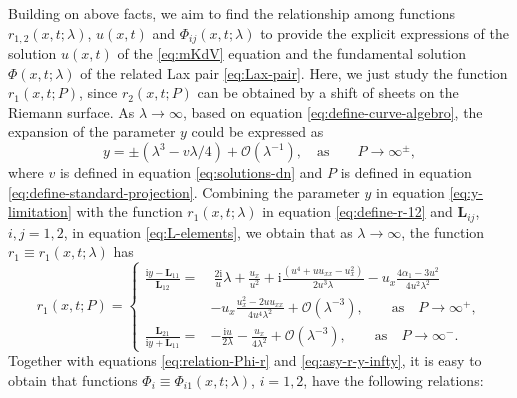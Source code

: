 \documentclass[11pt,reqno]{amsart}
\newcommand{\ii}{\mathrm{i}}
\numberwithin{equation}{section}
\begin{document}
Building on above facts, we aim to find the relationship among functions $r_{1,2}(x,t;\lambda)$, $u(x,t)$ and $\Phi_{ij}(x,t;\lambda)$ to provide the explicit expressions of the solution $u(x,t)$ of the \ref{eq:mKdV} equation and the fundamental solution $\Phi(x,t;\lambda)$ of the related Lax pair \eqref{eq:Lax-pair}.
Here, we just study the function $r_1(x,t;P)$, since $r_2(x,t;P)$ can be obtained by a shift of sheets on the Riemann surface.
As $\lambda\rightarrow \infty$, based on equation \eqref{eq:define-curve-algebro}, 
the expansion of the parameter $y$ could be expressed as 
\begin{equation}\label{eq:y-limitation}
	y=\pm \left(\lambda^3-v\lambda/4\right)+\mathcal{O}(\lambda^{-1}), \quad \text{as} \qquad P \rightarrow \infty^{\pm},
\end{equation}
where $v$ is defined in equation \eqref{eq:solutions-dn} and $P$ is defined in equation \eqref{eq:define-standard-projection}.
Combining the parameter $y$ in equation \eqref{eq:y-limitation} with the function $r_{1}(x,t;\lambda)$ in equation \eqref{eq:define-r-12} and $\mathbf{L}_{ij}$, $i,j=1,2$, in equation \eqref{eq:L-elements}, we obtain that as $\lambda\rightarrow \infty$, the function $r_{1}\equiv  r_{1}(x,t;\lambda)$ has 
\begin{equation}\label{eq:asy-r-y-infty}
		r_{1}(x,t;P)=\left\{
		\begin{aligned}
			\frac{ \ii y-\mathbf{L}_{11}}{\mathbf{L}_{12}}=&\ \frac{2\ii }{u}\lambda+\frac{ u_x}{u^2}+\ii\frac{(u^4+uu_{xx}-u_x^2)}{2u^3\lambda}-u_x\frac{4\alpha_1-3u^2}{4u^2\lambda^2}\\
			&-u_x\frac{u_x^2-2uu_{xx}}{4u^4\lambda^2}+\mathcal{O}(\lambda^{-3}),\qquad \text{as}\quad 
			P \rightarrow \infty^{+},\!\!\! \\
			\frac{\mathbf{L}_{21}}{ \ii y+\mathbf{L}_{11}}=& -\frac{\ii u}{2\lambda}-\frac{ u_x}{4\lambda^2}+\mathcal{O}(\lambda^{-3}), \qquad \text{as}\quad 
			P \rightarrow \infty^{-}.
		\end{aligned}\right.	
\end{equation}
Together with equations \eqref{eq:relation-Phi-r} and \eqref{eq:asy-r-y-infty}, it is easy to obtain that functions $\Phi_{i}\equiv \Phi_{i1}(x,t;\lambda)$, $i=1,2$, have the following relations:
\end{document}
